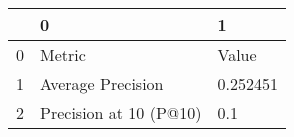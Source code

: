 \begin{tabular}{lll}
\toprule
{} &                       0 &         1 \\
\midrule
0 &                  Metric &     Value \\
1 &       Average Precision &  0.252451 \\
2 &  Precision at 10 (P@10) &       0.1 \\
\bottomrule
\end{tabular}
